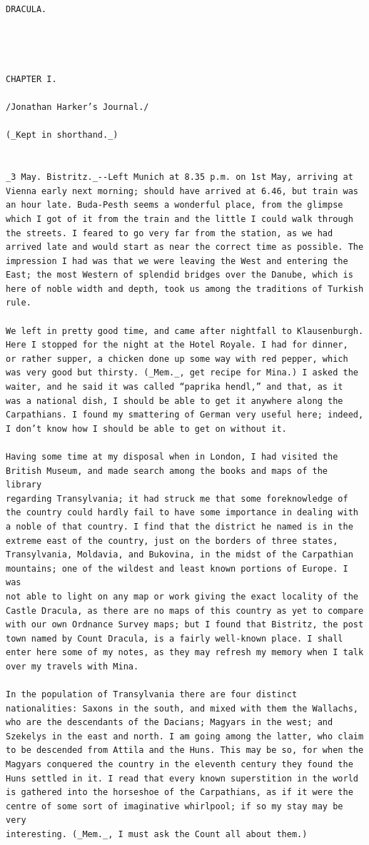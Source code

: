 \documentclass{article}
\begin{document}
\begin{verbatim}
DRACULA.




CHAPTER I.

/Jonathan Harker’s Journal./

(_Kept in shorthand._)


_3 May. Bistritz._--Left Munich at 8.35 p.m. on 1st May, arriving at
Vienna early next morning; should have arrived at 6.46, but train was
an hour late. Buda-Pesth seems a wonderful place, from the glimpse
which I got of it from the train and the little I could walk through
the streets. I feared to go very far from the station, as we had
arrived late and would start as near the correct time as possible. The
impression I had was that we were leaving the West and entering the
East; the most Western of splendid bridges over the Danube, which is
here of noble width and depth, took us among the traditions of Turkish
rule.

We left in pretty good time, and came after nightfall to Klausenburgh.
Here I stopped for the night at the Hotel Royale. I had for dinner,
or rather supper, a chicken done up some way with red pepper, which
was very good but thirsty. (_Mem._, get recipe for Mina.) I asked the
waiter, and he said it was called “paprika hendl,” and that, as it
was a national dish, I should be able to get it anywhere along the
Carpathians. I found my smattering of German very useful here; indeed,
I don’t know how I should be able to get on without it.

Having some time at my disposal when in London, I had visited the
British Museum, and made search among the books and maps of the library
regarding Transylvania; it had struck me that some foreknowledge of
the country could hardly fail to have some importance in dealing with
a noble of that country. I find that the district he named is in the
extreme east of the country, just on the borders of three states,
Transylvania, Moldavia, and Bukovina, in the midst of the Carpathian
mountains; one of the wildest and least known portions of Europe. I was
not able to light on any map or work giving the exact locality of the
Castle Dracula, as there are no maps of this country as yet to compare
with our own Ordnance Survey maps; but I found that Bistritz, the post
town named by Count Dracula, is a fairly well-known place. I shall
enter here some of my notes, as they may refresh my memory when I talk
over my travels with Mina.

In the population of Transylvania there are four distinct
nationalities: Saxons in the south, and mixed with them the Wallachs,
who are the descendants of the Dacians; Magyars in the west; and
Szekelys in the east and north. I am going among the latter, who claim
to be descended from Attila and the Huns. This may be so, for when the
Magyars conquered the country in the eleventh century they found the
Huns settled in it. I read that every known superstition in the world
is gathered into the horseshoe of the Carpathians, as if it were the
centre of some sort of imaginative whirlpool; if so my stay may be very
interesting. (_Mem._, I must ask the Count all about them.)


\end{verbatim}
\end{document}
